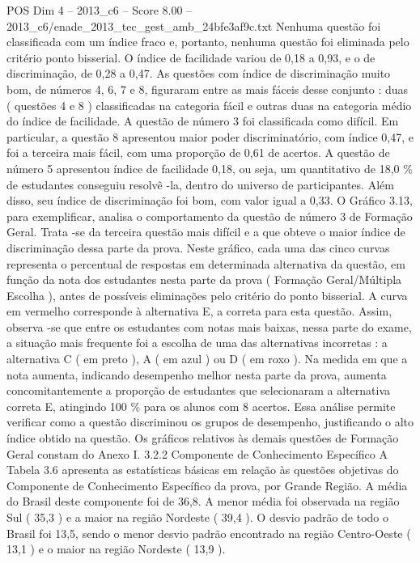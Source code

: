 \begin{textsample}{POS Dim 4 – 2013\_c6 – Score 8.00 – 2013\_c6/enade\_2013\_tec\_gest\_amb\_24bfe3af9c.txt}
Nenhuma questão foi classificada com um índice fraco e, portanto, nenhuma questão foi eliminada pelo critério ponto bisserial.
O índice de facilidade variou de 0,18 a 0,93, e o de discriminação, de 0,28 a 0,47.
As questões com índice de discriminação muito bom, de números 4, 6, 7 e 8, figuraram entre as mais fáceis desse conjunto : duas ( questões 4 e 8 ) classificadas na categoria fácil e outras duas na categoria médio do índice de facilidade.
A questão de número 3 foi classificada como difícil.
Em particular, a questão 8 apresentou maior poder discriminatório, com índice 0,47, e foi a terceira mais fácil, com uma proporção de 0,61 de acertos.
A questão de número 5 apresentou índice de facilidade 0,18, ou seja, um quantitativo de 18,0 \% de estudantes conseguiu resolvê -la, dentro do universo de participantes.
Além disso, seu índice de discriminação foi bom, com valor igual a 0,33.
O Gráfico 3.13, para exemplificar, analisa o comportamento da questão de número 3 de Formação Geral.
Trata -se da terceira questão mais difícil e a que obteve o maior índice de discriminação dessa parte da prova.
Neste gráfico, cada uma das cinco curvas representa o percentual de respostas em determinada alternativa da questão, em função da nota dos estudantes nesta parte da prova ( Formação Geral/Múltipla Escolha ), antes de possíveis eliminações pelo critério do ponto bisserial.
A curva em vermelho corresponde à alternativa E, a correta para esta questão.
Assim, observa -se que entre os estudantes com notas mais baixas, nessa parte do exame, a situação mais frequente foi a escolha de uma das alternativas incorretas : a alternativa C ( em preto ), A ( em azul ) ou D ( em roxo ).
Na medida em que a nota aumenta, indicando desempenho melhor nesta parte da prova, aumenta concomitantemente a proporção de estudantes que selecionaram a alternativa correta E, atingindo 100 \% para os alunos com 8 acertos.
Essa análise permite verificar como a questão discriminou os grupos de desempenho, justificando o alto índice obtido na questão.
Os gráficos relativos às demais questões de Formação Geral constam do Anexo I. 3.2.2 Componente de Conhecimento Específico A Tabela 3.6 apresenta as estatísticas básicas em relação às questões objetivas do Componente de Conhecimento Específico da prova, por Grande Região.
A média do Brasil deste componente foi de 36,8.
A menor média foi observada na região Sul ( 35,3 ) e a maior na região Nordeste ( 39,4 ).
O desvio padrão de todo o Brasil foi 13,5, sendo o menor desvio padrão encontrado na região Centro-Oeste ( 13,1 ) e o maior na região Nordeste ( 13,9 ).

\end{textsample}

